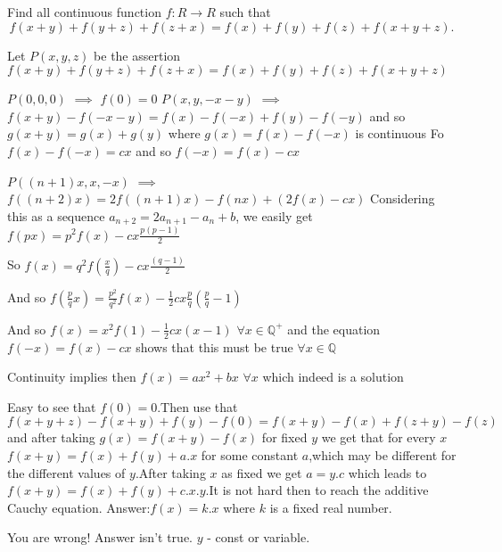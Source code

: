 \begin{solution}
	\begin{tcolorbox}Find all continuous function $f:R\rightarrow R$  such that   \[ f(x+y)+f(y+z)+f(z+x)=f(x)+f(y)+f(z)+f(x+y+z) .\]\end{tcolorbox}
Let $P(x,y,z)$ be the assertion $f(x+y)+f(y+z)+f(z+x)=f(x)+f(y)+f(z)+f(x+y+z)$

$P(0,0,0)$ $\implies$ $f(0)=0$
$P(x,y,-x-y)$ $\implies$ $f(x+y)-f(-x-y)=f(x)-f(-x)+f(y)-f(-y)$ and so $g(x+y)=g(x)+g(y)$ where $g(x)=f(x)-f(-x)$ is continuous
Fo $f(x)-f(-x)=cx$ and so $f(-x)=f(x)-cx$

$P((n+1)x,x,-x)$ $\implies$ $f((n+2)x)=2f((n+1)x)-f(nx)+(2f(x)-cx)$
Considering this as a sequence $a_{n+2}=2a_{n+1}-a_n+b$, we easily get $f(px)=p^2f(x)-cx\frac {p(p-1)}2$

So $f(x)=q^2f(\frac xq)-cx\frac {(q-1)}2$

And so $f(\frac pqx)=\frac{p^2}{q^2}f(x)-\frac 12 cx\frac pq(\frac pq-1)$

And so $f(x)=x^2f(1)-\frac 12 cx(x-1)$ $\forall x\in\mathbb Q^+$ and the equation $f(-x)=f(x)-cx$ shows that this must be true $\forall x\in\mathbb Q$

Continuity implies then $\boxed{f(x)=ax^2+bx}$ $\forall x$ which indeed is a solution
\end{solution}



\begin{solution}
	\begin{tcolorbox}Easy to see that $f(0)=0$.Then use that $f(x+y+z)-f(x+y)+f(y)-f(0)=f(x+y)-f(x)+f(z+y)-f(z)$ and after taking $g(x)=f(x+y)-f(x) $ for fixed $y$ we get that for every $x$ $f(x+y)=f(x)+f(y)+a.x$ for some constant $a$,which may be different for the different values of $y$.After taking $x$ as fixed we get $a=y.c$ which leads to $f(x+y)=f(x)+f(y)+c.x.y$.It is not hard then to reach the additive Cauchy equation.
Answer:$f(x)=k.x$ where $k$ is a fixed real number.\end{tcolorbox}
You are wrong!  Answer isn't true.
$y$ - const or variable.
\end{solution}




